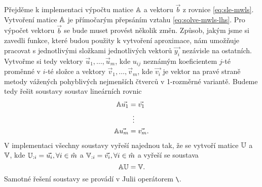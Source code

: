 Přejděme k implementaci výpočtu matice $\mathbb{A}$ a vektoru $\vec{b}$ z rovnice \ref{eq:sle-mwls}. Vytvoření matice $\mathbb{A}$ je přímočarým přepsáním vztahu \ref{eq:solve-mwls-lhs}. Pro výpočet vektoru $\vec{b}$ se bude muset provést několik změn. Způsob, jakým jsme si zavedli funkce, které budou použity k vytvoření aproximace, nám umožňuje pracovat s jednotlivými složkami jednotlivých vektorů $\vec{y_i}$ nezávisle na ostatních. Vytvořme si tedy vektory $\vec{u}_1, \ldots, \vec{u}_m$, kde $u_{ij}$ neznámým koeficientem $j$-té proměnné v $i$-té složce a vektory $\vec{v}_1, \ldots, \vec{v}_m$, kde $\vec{v_i}$ je vektor na pravé straně metody vážených pohyblivých nejmenších čtverců v 1-rozměrné variantě. Budeme tedy řešit soustavy soustav lineárních rovnic
\begin{align}
  \mathbb{A}\vec{u_1} &= \vec{v_1}\notag\\
                  &\;\;\vdots\notag\\
  \mathbb{A}\vec{u_m} &= \vec{v_m}\notag.
\end{align}
V implementaci všechny soustavy vyřeší najednou tak, že se vytvoří matice $\mathbb{U}$ a $\mathbb{V}$, kde $\mathbb{U}_{:i} = \vec{u_i}, \forall i \in \hat m$ a $\mathbb{V}_{:i} = \vec{v_i}, \forall i \in \hat m$ a vyřeší se soustava
\begin{equation}
  \mathbb{A}\mathbb{U} = \mathbb{V}.
\end{equation}
Samotné řešení soustavy se provádí v Julii operátorem \texttt{\textbackslash}.
